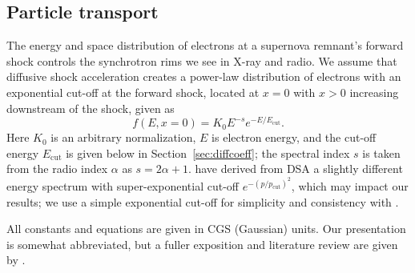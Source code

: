 \documentclass[iop, apj, numberedappendix]{emulateapj}
\newcommand*{\mt}{\mathrm}
\newcommand*{\Ecut}{E_{\mt{cut}}}
\begin{document}

\subsection{Particle transport}\label{sec:transport}

The energy and space distribution of electrons at a supernova remnant's forward
shock controls the synchrotron rims we see in X-ray and radio.  We assume that
diffusive shock acceleration creates a power-law distribution of electrons with
an exponential cut-off at the forward shock, located at $x = 0$ with $x > 0$
increasing downstream of the shock, given as
\begin{equation}
    f(E, x=0) = K_0 E^{-s} e^{-E/\Ecut} .
\end{equation}
Here $K_0$ is an arbitrary normalization, $E$ is electron energy, and the
cut-off energy $\Ecut$ is given below in Section~\ref{sec:diffcoeff}; the
spectral index $s$ is taken from the radio index $\alpha$ as $s = 2\alpha + 1$.
\citet{zirakashvili2007} have derived from DSA a slightly different energy
spectrum with super-exponential cut-off $e^{-(p/p_{\mt{cut}})^2}$, which may
impact our results; we use a simple exponential cut-off for simplicity and
consistency with .

All constants and equations are given in CGS (Gaussian) units.  Our
presentation is somewhat abbreviated, but a fuller exposition and literature
review are given by .
\end{document}
